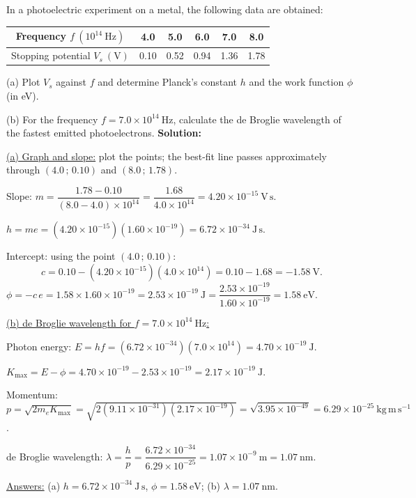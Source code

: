\documentclass[11pt]{article}
\begin{document}
\begin{exoresolu}
In a photoelectric experiment on a metal, the following data are obtained:

\begin{center}
\begin{tabular}{|c|c|c|c|c|c|}
\hline
Frequency $f\ (10^{14}\ \mathrm{Hz})$ & 4.0 & 5.0 & 6.0 & 7.0 & 8.0 \\ \hline
Stopping potential $V_s\ (\mathrm{V})$ & 0.10 & 0.52 & 0.94 & 1.36 & 1.78 \\ \hline
\end{tabular}
\end{center}
(a) Plot $V_s$ against $f$ and determine Planck's constant $h$ and the work function $\phi$ (in eV).\par
(b) For the frequency $f = 7.0\times10^{14}\ \mathrm{Hz}$, calculate the de Broglie wavelength of the fastest emitted photoelectrons.
\tcblower
\textbf{Solution:}\par
\underline{(a) Graph and slope:} plot the points; the best-fit line passes approximately through $(4.0\,;\,0.10)$ and $(8.0\,;\,1.78)$.\par
Slope: $m = \dfrac{1.78 - 0.10}{(8.0 - 4.0)\times10^{14}} = \dfrac{1.68}{4.0\times10^{14}} = 4.20\times10^{-15}\ \mathrm{V\,s}$.\par
$h = m e = (4.20\times10^{-15})(1.60\times10^{-19}) = 6.72\times10^{-34}\ \mathrm{J\,s}$.\par
Intercept: using the point $(4.0\,;\,0.10)$:
\[
c = 0.10 - (4.20\times10^{-15})(4.0\times10^{14}) = 0.10 - 1.68 = -1.58\ \mathrm{V}.
\]
$\phi = -c\, e = 1.58 \times 1.60\times10^{-19} = 2.53\times10^{-19}\ \mathrm{J} = \dfrac{2.53\times10^{-19}}{1.60\times10^{-19}} = 1.58\ \mathrm{eV}$.\par
\underline{(b) de Broglie wavelength for $f = 7.0\times10^{14}\ \mathrm{Hz}$:}\par
Photon energy: $E = hf = (6.72\times10^{-34})(7.0\times10^{14}) = 4.70\times10^{-19}\ \mathrm{J}$.\par
$K_{\max} = E - \phi = 4.70\times10^{-19} - 2.53\times10^{-19} = 2.17\times10^{-19}\ \mathrm{J}$.\par
Momentum: $p = \sqrt{2m_e K_{\max}} = \sqrt{2(9.11\times10^{-31})(2.17\times10^{-19})} = \sqrt{3.95\times10^{-49}} = 6.29\times10^{-25}\ \mathrm{kg\,m\,s^{-1}}$.\par
de Broglie wavelength: $\lambda = \dfrac{h}{p} = \dfrac{6.72\times10^{-34}}{6.29\times10^{-25}} = 1.07\times10^{-9}\ \mathrm{m} = 1.07\ \mathrm{nm}$.\par
\underline{Answers:} (a) $h = 6.72\times10^{-34}\ \mathrm{J\,s}$, $\phi = 1.58\ \mathrm{eV}$; (b) $\lambda = 1.07\ \mathrm{nm}$.
\end{exoresolu}
\end{document}
